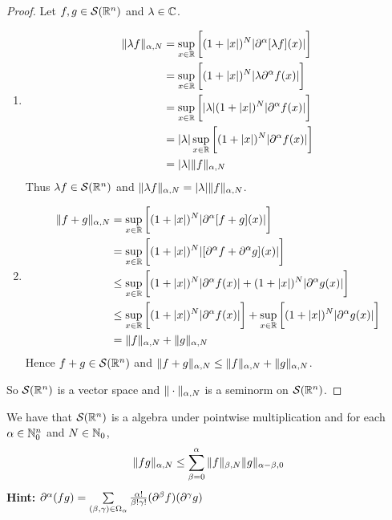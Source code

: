 \documentclass{book}
\begin{document}
	\begin{proof} Let $f, g \in \mathcal{S}(\mathbb{R}^n)$ and $\lambda \in \mathbb{C}$.
		\begin{enumerate}
			\item 
			\begin{align*}
				\|\lambda f\|_{\alpha, N}
				& = \sup_{x \in \mathbb{R}} \bigg[  (1 + |x|)^N |\partial^{\alpha}[\lambda f] (x)| \bigg] \\
				& = \sup_{x \in \mathbb{R}} \bigg[  (1 + |x|)^N |\lambda \partial^{\alpha}f (x)| \bigg] \\
				& = \sup_{x \in \mathbb{R}} \bigg[  |\lambda| (1 + |x|)^N | \partial^{\alpha}f (x)| \bigg] \\
				& = |\lambda| \sup_{x \in \mathbb{R}} \bigg[ (1 + |x|)^N | \partial^{\alpha}f (x)| \bigg] \\
				& = |\lambda | \|f\|_{\alpha, N}
			\end{align*}
			Thus $\lambda f \in \mathcal{S}(\mathbb{R}^n)$ and $\|\lambda f\|_{\alpha, N} = |\lambda | \|f\|_{\alpha, N}$.
		\item \begin{align*}
			\|f  +  g\|_{\alpha, N} 
			& = \sup_{x \in \mathbb{R}} \bigg[  (1 + |x|)^N |\partial^{\alpha}[f + g] (x)| \bigg] \\
			& = \sup_{x \in \mathbb{R}} \bigg[  (1 + |x|)^N |[\partial^{\alpha} f  + \partial^{\alpha} g] (x)| \bigg] \\
			& \leq \sup_{x \in \mathbb{R}} \bigg[  (1 + |x|)^N |\partial^{\alpha} f (x)|  +  (1 + |x|)^N |\partial^{\alpha} g (x)| \bigg] \\
			& \leq \sup_{x \in \mathbb{R}} \bigg[  (1 + |x|)^N |\partial^{\alpha} f (x)| \bigg]   + \sup_{x \in \mathbb{R}} \bigg[ (1 + |x|)^N |\partial^{\alpha} g (x)| \bigg] \\
			& = \|f\|_{\alpha, N} + \|g\|_{\alpha, N} 
		\end{align*}
	 	Hence $f + g \in \mathcal{S}(\mathbb{R}^n)$ and $\|f + g\|_{\alpha, N} \leq \|f\|_{\alpha, N} + \|g\|_{\alpha, N}$.
		\end{enumerate}
		So $\mathcal{S}(\mathbb{R}^n)$ is a vector space and $\| \cdot \|_{\alpha, N}$ is a seminorm on $\mathcal{S}(\mathbb{R}^n)$.
	\end{proof}

	\begin{ex} 
		We have that $\mathcal{S}(\mathbb{R}^n)$ is a algebra under pointwise multiplication and for each $\alpha \in \mathbb{N}_0^n$ and $N \in  \mathbb{N}_0$, 
		$$\|fg\|_{\alpha, N} \leq \sum\limits_{\beta=0}^\alpha  \|f\|_{\beta, N} \|g\|_{\alpha - \beta, 0}$$
		\textbf{Hint:} $\partial^{\alpha}(fg) = \sum\limits_{(\beta, \gamma) \in \Omega_{\alpha}} \frac{\alpha!}{\beta! \gamma!}(\partial^{\beta}f) (\partial^{\gamma}g)$
	\end{ex}
\end{document}
